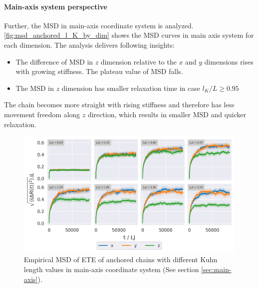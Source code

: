 \documentclass[
    paper=A4,pagesize=automedia,fontsize=12pt,
    BCOR=15mm,DIV=22,
    twoside,headinclude,footinclude=false,
    fleqn,             %
    bibliography=totocnumbered,          %
    listof=totoc,                %
    listof=flat,                 %
    cleardoublepage=empty      %
    numbers=endperiod
]{scrartcl}
\begin{document}
\FloatBarrier


\paragraph{Main-axis system perspective}
Further, the MSD in main-axis coordinate system is analyzed.
\autoref{fig:msd_anchored_l_K_by_dim} shows the MSD curves in main axis system
for each dimension. The analysis delivers following insights:
\begin{itemize}
    \item The difference of MSD in $z$ dimension relative to the $x$ and $y$
    dimensions rises with growing stiffness. The plateau value of MSD falls.
    \item The MSD in $z$ dimension has smaller relaxation time in case $l_K/L \ge 0.95$ 
\end{itemize}
The chain becomes more straight with rising stiffness and therefore has less
movement freedom along $z$ direction, which results in smaller MSD and quicker
relaxation.

\begin{figure}
    \begin{center}
      \includegraphics[width=\columnwidth,trim={0cm 0cm 0cm 0.0cm},clip]{4-exp-msd_by_dim.png}
      \caption{\label{fig:msd_anchored_l_K_by_dim}
      Empirical MSD of ETE of anchored chains with different Kuhn length values in
      main-axis coordinate system (See section \ref{sec:main-axis}).
      }
    \end{center}
\end{figure}

\FloatBarrier
\end{document}
